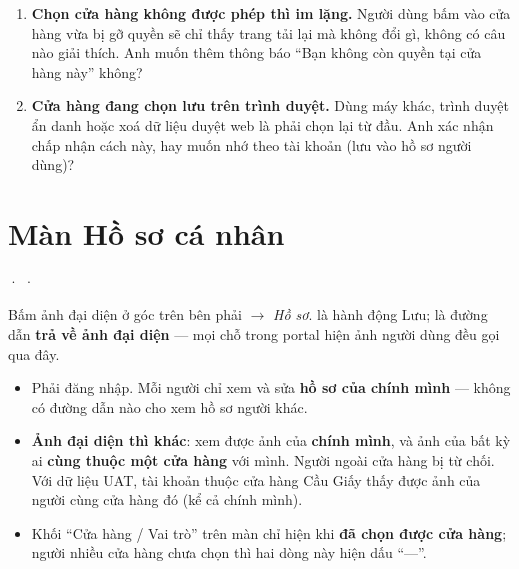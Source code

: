 \begin{ask}
\begin{enumerate}[leftmargin=*]
  \item \textbf{Chọn cửa hàng không được phép thì im lặng.} Người dùng bấm vào cửa hàng vừa bị
        gỡ quyền sẽ chỉ thấy trang tải lại mà không đổi gì, không có câu nào giải thích. Anh
        muốn thêm thông báo ``Bạn không còn quyền tại cửa hàng này'' không?
  \item \textbf{Cửa hàng đang chọn lưu trên trình duyệt.} Dùng máy khác, trình duyệt ẩn danh
        hoặc xoá dữ liệu duyệt web là phải chọn lại từ đầu. Anh xác nhận chấp nhận cách này,
        hay muốn nhớ theo tài khoản (lưu vào hồ sơ người dùng)?
\end{enumerate}
\end{ask}

\section{Màn Hồ sơ cá nhân}
 ·  · 
\medskip

\mvao

Bấm ảnh đại diện ở góc trên bên phải $\rightarrow$ \emph{Hồ sơ}.
 là hành động Lưu;  là đường dẫn
\textbf{trả về ảnh đại diện} --- mọi chỗ trong portal hiện ảnh người dùng đều gọi qua đây.

\mai

\begin{itemize}[leftmargin=*]
  \item Phải đăng nhập. Mỗi người chỉ xem và sửa \textbf{hồ sơ của chính mình} --- không có
        đường dẫn nào cho xem hồ sơ người khác.
  \item \textbf{Ảnh đại diện thì khác}: xem được ảnh của \textbf{chính mình}, và ảnh của bất kỳ
        ai \textbf{cùng thuộc một cửa hàng} với mình. Người ngoài cửa hàng bị từ chối. Với dữ
        liệu UAT, tài khoản thuộc cửa hàng Cầu Giấy thấy được ảnh của  người cùng cửa hàng
        đó (kể cả chính mình).
  \item Khối ``Cửa hàng / Vai trò'' trên màn chỉ hiện khi \textbf{đã chọn được cửa hàng}; người
        nhiều cửa hàng chưa chọn thì hai dòng này hiện dấu ``---''.
\end{itemize}

\mhien

